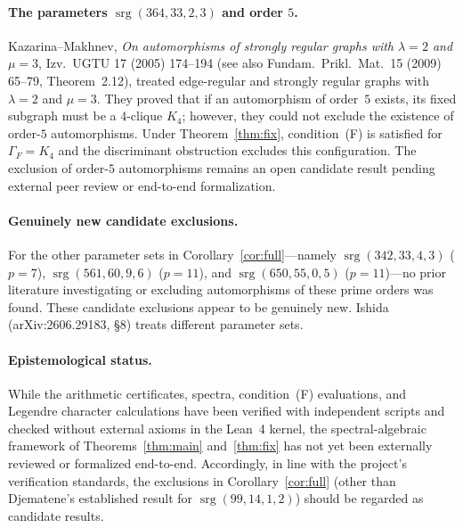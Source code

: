 \documentclass[11pt,a4paper]{article}
\theoremstyle{remark}
\newcommand{\srg}{\operatorname{srg}}
\begin{document}
\paragraph{The parameters $\srg(364,33,2,3)$ and order $5$.}
Kazarina--Makhnev, \emph{On automorphisms of strongly regular graphs with $\lambda=2$ and $\mu=3$}, Izv.\ UGTU 17 (2005) 174--194 (see also Fundam.\ Prikl.\ Mat.\ 15 (2009) 65--79, Theorem~2.12), treated edge-regular and strongly regular graphs with $\lambda = 2$ and $\mu = 3$.
They proved that if an automorphism of order~$5$ exists, its fixed subgraph must be a $4$-clique $K_4$; however, they could not exclude the existence of order-$5$ automorphisms.
Under Theorem~\ref{thm:fix}, condition~(F) is satisfied for $\Gamma_F = K_4$ and the discriminant obstruction excludes this configuration.
The exclusion of order-$5$ automorphisms remains an open candidate result pending external peer review or end-to-end formalization.

\paragraph{Genuinely new candidate exclusions.}
For the other parameter sets in Corollary~\ref{cor:full}---namely $\srg(342,33,4,3)$ ($p = 7$), $\srg(561,60,9,6)$ ($p = 11$), and $\srg(650,55,0,5)$ ($p = 11$)---no prior literature investigating or excluding automorphisms of these prime orders was found.
These candidate exclusions appear to be genuinely new.
Ishida (arXiv:2606.29183, \S8) treats different parameter sets.

\paragraph{Epistemological status.}
While the arithmetic certificates, spectra, condition~(F) evaluations, and Legendre character calculations have been verified with independent scripts and checked without external axioms in the Lean~4 kernel, the spectral-algebraic framework of Theorems~\ref{thm:main} and~\ref{thm:fix} has not yet been externally reviewed or formalized end-to-end.
Accordingly, in line with the project's verification standards, the exclusions in Corollary~\ref{cor:full} (other than Djematene's established result for $\srg(99,14,1,2)$) should be regarded as candidate results.
\end{document}
